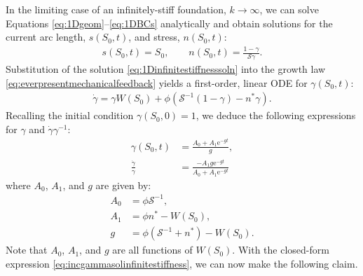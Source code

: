 In the limiting case of an infinitely-stiff foundation, $k \to \infty$, we can solve Equations \eqref{eq:1Dgeom}--\eqref{eq:1DBCs} analytically and obtain solutions for the current arc length, $s(S_0, t)$, and stress, $n(S_0, t)$:
\begin{align}
s(S_0, t) = S_0, \qquad n(S_0, t) = \frac{1 - \gamma}{\mathcal{S}\gamma}.\label{eq:1Dinfinitestiffnesssoln}
\end{align}
Substitution of the solution \eqref{eq:1Dinfinitestiffnesssoln} into the growth law \eqref{eq:everpresentmechanicalfeedback} yields a first-order, linear ODE for $\gamma(S_0, t)$:
\begin{align}
\dot{\gamma} = \gamma W(S_0) + \phi\left(\mathcal{S}^{-1}(1 - \gamma) - n^*\gamma\right).
\end{align}
Recalling the initial condition $\gamma(S_0, 0) = 1$, we deduce the following expressions for $\gamma$ and $\dot{\gamma}\gamma^{-1}$:
\begin{align}
\gamma(S_0, t) &= \frac{A_0 + A_1\mathrm{e}^{-gt}}{g}, \label{eq:gammasolninfinitestiffness}\\
\frac{\dot{\gamma}}{\gamma} &= \frac{-A_1g\mathrm{e}^{-gt}}{A_0 + A_1\mathrm{e}^{-gt}}\label{eq:incgammasolinfinitestiffness}
\end{align}
where $A_0$, $A_1$, and $g$ are given by:
\begin{align}
A_0 &= \phi\mathcal{S}^{-1},\nonumber\\
A_1 &= \phi n^* - W(S_0),\nonumber\\
g &= \phi(\mathcal{S}^{-1} + n^*) - W(S_0).\label{eq:A0A1g}
\end{align}
Note that $A_0$, $A_1$, and $g$ are all functions of $W(S_0)$.
With the closed-form expression \eqref{eq:incgammasolinfinitestiffness}, we can now make the following claim.
